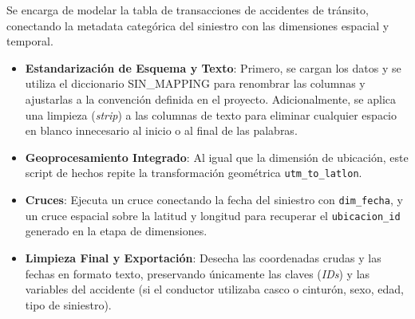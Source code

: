 Se encarga de modelar la tabla de transacciones de accidentes de tránsito, 
conectando la metadata categórica del siniestro con las dimensiones espacial
y temporal.
\begin{itemize}[noitemsep]
    \item \textbf{Estandarización de Esquema y Texto}: 
        Primero, se cargan los datos y se utiliza el diccionario SIN\_MAPPING
        para renombrar las columnas y ajustarlas a la convención definida en el
        proyecto. 
        Adicionalmente, se aplica una limpieza (\textit{strip}) a 
        las columnas de texto para eliminar cualquier espacio en blanco
        innecesario al inicio o al final de las palabras.
    \item \textbf{Geoprocesamiento Integrado}:
        Al igual que la dimensión de ubicación, este script de hechos repite la
        transformación geométrica \texttt{utm\_to\_latlon}.
    \item \textbf{Cruces}:
        Ejecuta un cruce conectando la fecha del siniestro con
        \texttt{dim\_fecha}, y un cruce espacial sobre la latitud y longitud 
        para recuperar el \texttt{ubicacion\_id} generado en la etapa de 
        dimensiones.
    \item \textbf{Limpieza Final y Exportación}:
        Desecha las coordenadas crudas y las fechas en formato texto, 
        preservando únicamente las claves (\textit{IDs}) y las
        variables del accidente (si el conductor 
        utilizaba casco o cinturón, sexo, edad, tipo de siniestro). 
\end{itemize}
